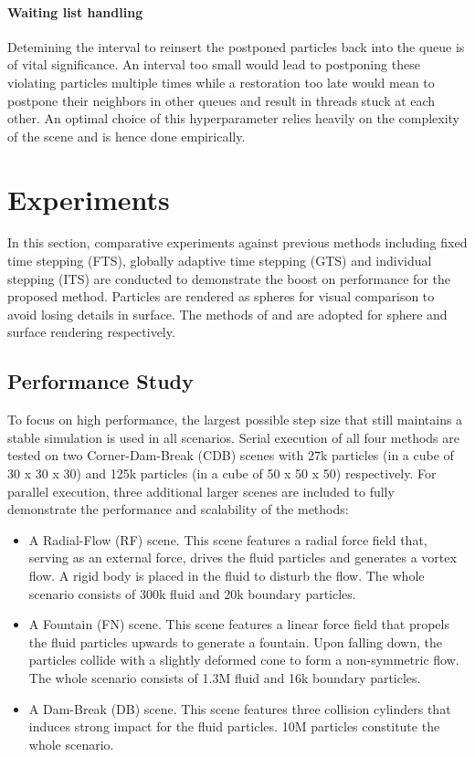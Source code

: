 \documentclass[
	11pt, 
	DIV10,
	ngerman,
	a4paper, 
	oneside, 
	headings=normal, 
	captions=tableheading,
	final, 
	numbers=noenddot
]{scrartcl}
\begin{document}
\paragraph{Waiting list handling}
Detemining the interval to reinsert the postponed particles back into the queue is of vital significance. An interval too small would lead to postponing these violating particles multiple times while a restoration too late would mean to postpone their neighbors in other queues and result in threads stuck at each other. An optimal choice of this hyperparameter relies heavily on the complexity of the scene and is hence done empirically.

\section{Experiments}
In this section, comparative experiments against previous methods including fixed time stepping (FTS), globally adaptive time stepping (GTS) \cite{desbrun1996smoothed} and individual stepping (ITS) \cite{ban2018adaptively} are conducted to demonstrate the boost on performance for the proposed method. Particles are rendered as spheres for visual comparison to avoid losing details in surface. The methods of \cite{reinhardt2017visual} and \cite{bhatacharya2011level} are adopted for sphere and surface rendering respectively.

\subsection{Performance Study}
To focus on high performance, the largest possible step size that still maintains a stable simulation is used in all scenarios. Serial execution of all four methods are tested on two Corner-Dam-Break (CDB) scenes with 27k particles (in a cube of 30 x 30 x 30) and 125k particles (in a cube of 50 x 50 x 50) respectively. For parallel execution, three additional larger scenes are included to fully demonstrate the performance and scalability of the methods:

\begin{itemize}
    \item A Radial-Flow (RF) scene. This scene features a radial force field that, serving as an external force, drives the fluid particles and generates a vortex flow. A rigid body is placed in the fluid to disturb the flow. The whole scenario consists of 300k fluid and 20k boundary particles.
    \item A Fountain (FN) scene. This scene features a linear force field that propels the fluid particles upwards to generate a fountain. Upon falling down, the particles collide with a slightly deformed cone to form a non-symmetric flow. The whole scenario consists of 1.3M fluid and 16k boundary particles.
    \item A Dam-Break (DB) scene. This scene features three collision cylinders that induces strong impact for the fluid particles. 10M particles constitute the whole scenario.
\end{itemize}
\end{document}
